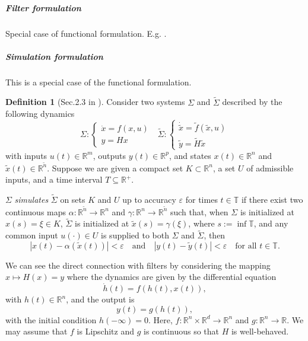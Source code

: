 \documentclass{article}
\theoremstyle{definition}
\newtheorem{definition}{Definition}
\theoremstyle{remark}
\begin{document}
\subparagraph{Filter formulation}
Special case of functional formulation.
E.g. \citet{grigoryeva2018universal}.


\subparagraph{Simulation formulation}
This is a special case of the functional formulation. %

\begin{definition}[Sec.2.3 in \citep{sontag1992neural}]
Consider two systems $\Sigma$ and $\tilde\Sigma$ described by the following dynamics 
\begin{equation}
    \Sigma: \begin{cases}
        \dot x = f (x, u)\\ y = Hx
    \end{cases}
    \ \ \ 
    \tilde\Sigma: \begin{cases}
        \dot{\tilde x} = \tilde f (\tilde x, u)\\ \tilde y = \tilde H\tilde x
    \end{cases}
\end{equation} 
with inputs $u(t) \in \mathbb{R}^m$, outputs $y(t) \in \mathbb{R}^p$, and states $x(t) \in \mathbb{R}^n$ and $\tilde{x}(t) \in \mathbb{R}^{\tilde{n}}$. Suppose we are given a compact set $K \subset \mathbb{R}^n$, a set $U$ of admissible inputs, and a time interval $T \subseteq \mathbb{R}^+$.

$\Sigma$ \emph{simulates} $\tilde{\Sigma}$ on sets $K$ and $U$ up to accuracy $\varepsilon$ for times $t \in \mathbb{T}$ if there exist two continuous maps $\alpha : \mathbb{R}^{\tilde{n}} \to \mathbb{R}^n$ and $\gamma : \mathbb{R}^n \to \mathbb{R}^{\tilde{n}}$ such that, when $\Sigma$ is initialized at $x(s) = \xi \in K$, $\tilde{\Sigma}$ is initialized at $\tilde{x}(s) = \gamma(\xi)$, where $s := \inf \mathbb{T}$, and any common input $u(\cdot) \in U$ is supplied to both $\Sigma$ and $\tilde{\Sigma}$, then
\[
|x(t) - \alpha(\tilde{x}(t))| < \varepsilon \quad \text{and} \quad |y(t) - \tilde{y}(t)| < \varepsilon \quad \text{for all } t \in \mathbb{T}.
\]
\end{definition}


We can see the direct connection with filters by considering the mapping \( x \mapsto H(x) = y \) where the dynamics are given by the differential equation
\begin{equation}\label{eq:hidden}
\dot{h}(t) = f(h(t), x(t)),
\end{equation}
with \( h(t) \in \mathbb{R}^n \), and the output is
\begin{equation}\label{eq:output}
y(t) = g(h(t)),
\end{equation}
with the initial condition $h(-\infty) = 0$.
Here, \( f: \mathbb{R}^n \times \mathbb{R}^d \to \mathbb{R}^n \) and \( g: \mathbb{R}^n \to \mathbb{R} \).
We may assume that \( f \) is Lipschitz and \( g \) is continuous so that \( H \) is well-behaved.
\end{document}
